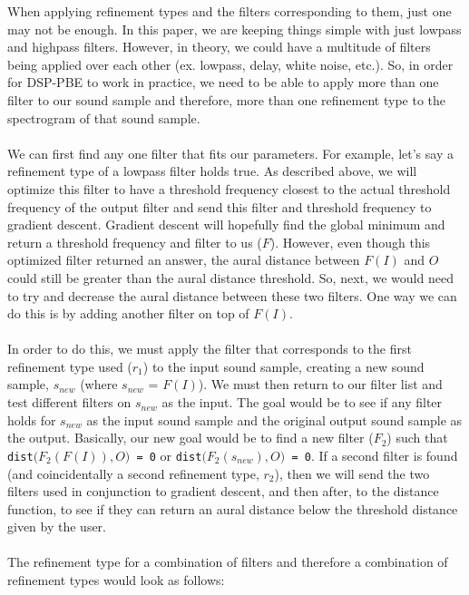 \documentclass[english, 11pt]{article}
\begin{document}
When applying refinement types and the filters corresponding to them, just one may not be enough. In this paper, we are keeping things simple with just lowpass and highpass filters. However, in theory, we could have a multitude of filters being applied over each other (ex. lowpass, delay, white noise, etc.). So, in order for DSP-PBE to work in practice, we need to be able to apply more than one filter to our sound sample and therefore, more than one refinement type to the spectrogram of that sound sample. \\ \\
We can first find any one filter that fits our parameters. For example, let's say a refinement type of a lowpass filter holds true. As described above, we will optimize this filter to have a threshold frequency closest to the actual threshold frequency of the output filter and send this filter and threshold frequency  to gradient descent. Gradient descent will hopefully find the global minimum and return a threshold frequency and filter to us ($F$). However, even though this optimized filter returned an answer, the aural distance between $F(I)$ and $O$ could still be greater than the aural distance threshold. So, next, we would need to try and decrease the aural distance between these two filters. One way we can do this is by adding another filter on top of $F(I)$. \\ \\
In order to do this, we must apply the filter that corresponds to the first refinement type used ($r_1$) to the input sound sample, creating a new sound sample, $s_{new}$ (where $s_{new}$ = $F(I)$). We must then return to our filter list and test different filters on $s_{new}$ as the input. The goal would be to see if any filter holds for $s_{new}$ as the input sound sample and the original output sound sample as the output. Basically, our new goal would be to find a new filter ($F_2$) such that \texttt{dist}$(F_2$$(F(I)), O)$\texttt{ = 0} or \texttt{dist}$(F_2$$(s_{new}), O)$\texttt{ = 0}. If a second filter is found (and coincidentally a second refinement type, $r_2$), then we will send the two filters used in conjunction to gradient descent, and then after, to the distance function, to see if they can return an aural distance below the threshold distance given by the user. \\ \\
The refinement type for a combination of filters and therefore a combination of refinement types would look as follows: \\
\end{document}
